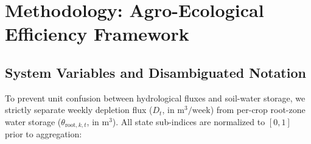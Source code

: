 \documentclass[11pt,a4paper]{article}
\begin{document}
\section{Methodology: Agro-Ecological Efficiency Framework}

\subsection{System Variables and Disambiguated Notation}
To prevent unit confusion between hydrological fluxes and soil-water storage, we strictly separate weekly depletion flux ($D_t$, in $\mathrm{m}^3/\text{week}$) from per-crop root-zone water storage ($\theta_{\mathrm{root},k,t}$, in $\mathrm{m}^3$). All state sub-indices are normalized to $[0, 1]$ prior to aggregation:
\end{document}
